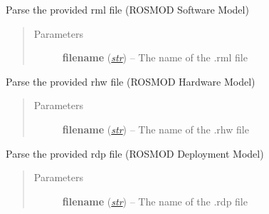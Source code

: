 \documentclass[letterpaper,10pt,english]{sphinxmanual}
\begin{document}
\begin{fulllineitems}
\begin{fulllineitems}
\begin{quote}
\begin{description}
\end{description}\end{quote}

\end{fulllineitems}


\begin{fulllineitems}
\label{class_Project:ROSMOD_Project.parse_rml}
Parse the provided rml file (ROSMOD Software Model)
\begin{quote}\begin{description}
\item[{Parameters}] \leavevmode
\textbf{filename} (\href{http://docs.python.org/library/functions.html\#str}{\emph{str}}) -- The name of the .rml file

\end{description}\end{quote}

\end{fulllineitems}


\begin{fulllineitems}
\label{class_Project:ROSMOD_Project.parse_rhw}
Parse the provided rhw file (ROSMOD Hardware Model)
\begin{quote}\begin{description}
\item[{Parameters}] \leavevmode
\textbf{filename} (\href{http://docs.python.org/library/functions.html\#str}{\emph{str}}) -- The name of the .rhw file

\end{description}\end{quote}

\end{fulllineitems}


\begin{fulllineitems}
\label{class_Project:ROSMOD_Project.parse_rdp}
Parse the provided rdp file (ROSMOD Deployment Model)
\begin{quote}\begin{description}
\item[{Parameters}] \leavevmode
\textbf{filename} (\href{http://docs.python.org/library/functions.html\#str}{\emph{str}}) -- The name of the .rdp file


\end{description}
\end{quote}
\end{fulllineitems}
\end{fulllineitems}
\end{document}
